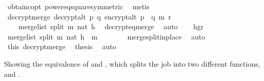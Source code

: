 \begin{isabellebody}
\ obtain{\isacharunderscore}{\kern0pt}c{\isacharunderscore}{\kern0pt}opt{}\ power{}{\isacharunderscore}{\kern0pt}eq{\isacharunderscore}{\kern0pt}square{\isacharbrackleft}{\kern0pt}symmetric{\isacharbrackright}{\kern0pt}\ \isamarkupfalse%
\ metis\isanewline
\ \ \isanewline
\ \ \isamarkupfalse%
\ \isamarkupfalse%
\ decrypt{\isacharunderscore}{\kern0pt}merge{\isacharcolon}{\kern0pt}\ {\isachardoublequoteopen}decrypt{\isacharunderscore}{\kern0pt}alt\ p\ q\ {\isacharparenleft}{\kern0pt}encrypt{\isacharunderscore}{\kern0pt}alt\ {\isacharparenleft}{\kern0pt}p\ {\isacharasterisk}{\kern0pt}\ q{\isacharparenright}{\kern0pt}\ m\ r{\isacharparenright}{\kern0pt}\ {\isacharequal}{\kern0pt}\ \isanewline
\ \ \ \ merge{\isacharunderscore}{\kern0pt}list\ {\isacharparenleft}{\kern0pt}{\isacharparenleft}{\kern0pt}split\ m\ {\isacharparenleft}{\kern0pt}nat\ h{\isacharparenright}{\kern0pt}{\isacharparenright}{\kern0pt}{\isacharparenright}{\kern0pt}{\isachardoublequoteclose}\ \isamarkupfalse%
\ decrypt{\isacharunderscore}{\kern0pt}eq{\isacharunderscore}{\kern0pt}merge\ \isamarkupfalse%
\ auto\isanewline
\isanewline
\ \ \isamarkupfalse%
\ h{\isacharunderscore}{\kern0pt}gr{\isacharunderscore}{\kern0pt}{}\ \isamarkupfalse%
\ {\isachardoublequoteopen}merge{\isacharunderscore}{\kern0pt}list\ {\isacharparenleft}{\kern0pt}{\isacharparenleft}{\kern0pt}split\ m\ {\isacharparenleft}{\kern0pt}nat\ h{\isacharparenright}{\kern0pt}{\isacharparenright}{\kern0pt}{\isacharparenright}{\kern0pt}\ {\isacharequal}{\kern0pt}\ m{\isachardoublequoteclose}\ \isanewline
\ \ \ \ \ \isamarkupfalse%
\ merge{\isacharunderscore}{\kern0pt}split{\isacharunderscore}{\kern0pt}in{\isacharunderscore}{\kern0pt}place\ \isamarkupfalse%
\ auto\isanewline
\isanewline
\ \ \isamarkupfalse%
\ this\ decrypt{\isacharunderscore}{\kern0pt}merge\ \isamarkupfalse%
\ {\isacharquery}{\kern0pt}thesis\ \isamarkupfalse%
\ auto\ \isanewline
\ \isamarkupfalse%
%
\endisatagproof
{\isafoldproof}%
%
\isadelimproof
%
\endisadelimproof
%
\begin{isamarkuptext}%
Showing the equivalence of  and , which splits the job into two different 
 functions,  and .%

\end{isamarkuptext}
\end{isabellebody}
